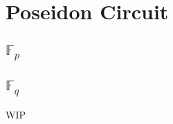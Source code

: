 \section{Poseidon Circuit}
\label{section:poseidon}

\subsection{$\mathbb{F}_p$}

\subsection{$\mathbb{F}_q$}
WIP